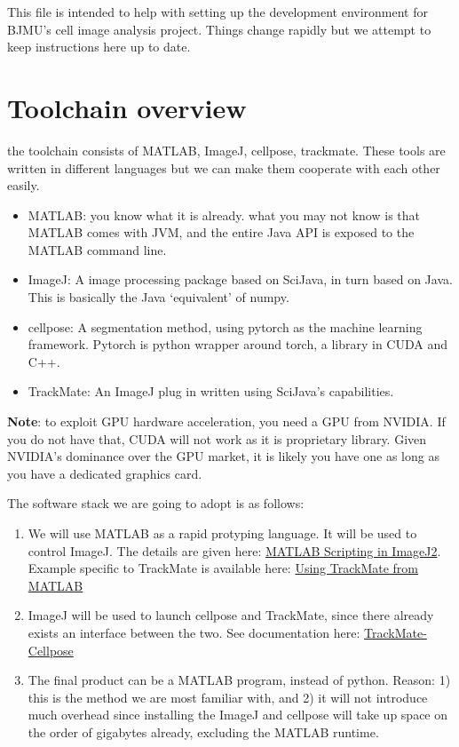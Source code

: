 \documentclass[11pt]{article}
\author{Yantao Xia}
\date{\textit{<2022-05-15 Sun>}}
\title{}
\begin{document}
\tableofcontents

This file is intended to help with setting up the development environment for BJMU's cell image analysis project. Things change rapidly but we attempt to keep instructions here up to date. 

\section{Toolchain overview}
\label{sec:orgf7213ea}
the toolchain consists of MATLAB, ImageJ, cellpose, trackmate. These tools are written in different languages but we can make them cooperate with each other easily. 
\begin{itemize}
\item MATLAB: you know what it is already. what you may not know is that MATLAB comes with JVM, and the entire Java API is exposed to the MATLAB command line.
\item ImageJ: A image processing package based on SciJava, in turn based on Java. This is basically the Java `equivalent' of numpy.
\item cellpose: A segmentation method, using pytorch as the machine learning framework. Pytorch is python wrapper around torch, a library in CUDA and C++.
\item TrackMate: An ImageJ plug in written using SciJava's capabilities.
\end{itemize}
\textbf{Note}: to exploit GPU hardware acceleration, you need a GPU from NVIDIA. If you do not have that, CUDA will not work as it is proprietary library. Given NVIDIA's dominance over the GPU market, it is likely you have one as long as you have a dedicated graphics card. 

The software stack we are going to adopt is as follows:
\begin{enumerate}
\item We will use MATLAB as a rapid protyping language. It will be used to control ImageJ. The details are given here: \href{https://imagej.net/scripting/matlab}{MATLAB Scripting in ImageJ2}. Example specific to TrackMate is available here: \href{https://imagej.net/plugins/trackmate/using-from-matlab}{Using TrackMate from MATLAB}
\item ImageJ will be used to launch cellpose and TrackMate, since there already exists an interface between the two. See documentation here: \href{https://imagej.net/plugins/trackmate/trackmate-cellpose}{TrackMate-Cellpose}
\item The final product can be a MATLAB program, instead of python. Reason: 1) this is the method we are most familiar with, and 2) it will not introduce much overhead since installing the ImageJ and cellpose will take up space on the order of gigabytes already, excluding the MATLAB runtime.
\end{enumerate}
\end{document}
